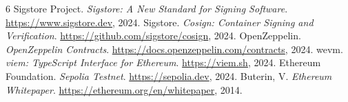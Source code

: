 \documentclass[11pt,a4paper]{article}
\begin{document}
\begin{thebibliography}{6}\small
{} Sigstore Project. \textit{Sigstore: A New Standard for Signing Software}. \url{https://www.sigstore.dev}, 2024.
 Sigstore. \textit{Cosign: Container Signing and Verification}. \url{https://github.com/sigstore/cosign}, 2024.
 OpenZeppelin. \textit{OpenZeppelin Contracts}. \url{https://docs.openzeppelin.com/contracts}, 2024.
 wevm. \textit{viem: TypeScript Interface for Ethereum}. \url{https://viem.sh}, 2024.
 Ethereum Foundation. \textit{Sepolia Testnet}. \url{https://sepolia.dev}, 2024.
 Buterin, V. \textit{Ethereum Whitepaper}. \url{https://ethereum.org/en/whitepaper}, 2014.
\end{thebibliography}
\end{document}
